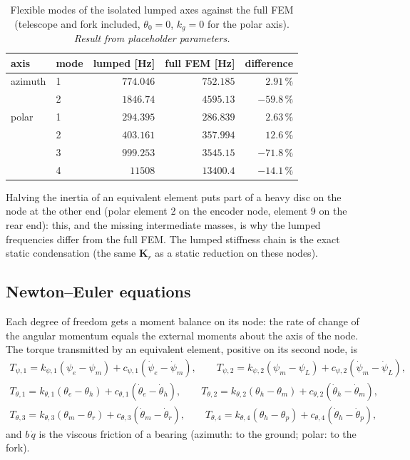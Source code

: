\documentclass[10pt,a4paper]{article}
\numberwithin{equation}{section}
\begin{document}
\begin{table}[H]\centering\small
\caption{Flexible modes of the isolated lumped axes against the full FEM (telescope and fork included, $\theta_0 = 0$, $k_g = 0$ for the polar axis). \emph{Result from placeholder parameters.}}\label{tab:lump_freq}
\begin{tabular}{llrrr}\toprule
axis & mode & lumped [Hz] & full FEM [Hz] & difference \\ \midrule
azimuth & 1 & $774.046$ & $752.185$ & $2.91\,\%$ \\
 & 2 & $1846.74$ & $4595.13$ & $-59.8\,\%$ \\
polar & 1 & $294.395$ & $286.839$ & $2.63\,\%$ \\
 & 2 & $403.161$ & $357.994$ & $12.6\,\%$ \\
 & 3 & $999.253$ & $3545.15$ & $-71.8\,\%$ \\
 & 4 & $11508$ & $13400.4$ & $-14.1\,\%$ \\
\bottomrule\end{tabular}\end{table}
Halving the inertia of an equivalent element puts part of a heavy disc on the node at the other end (polar element 2 on the encoder node, element 9 on the rear end): this, and the missing intermediate masses, is why the lumped frequencies differ from the full FEM. The lumped stiffness chain is the exact static condensation (the same $\mathbf K_r$ as a static reduction on these nodes).
\subsection{Newton--Euler equations}\label{subsec:lump_ne}
Each degree of freedom gets a moment balance on its node: the rate of change of the angular momentum equals the external moments about the axis of the node. The torque transmitted by an equivalent element, positive on its second node, is
\begin{gather}
T_{\psi,1} = k_{\psi,1}(\psi_e - \psi_m) + c_{\psi,1}(\dot\psi_e - \dot\psi_m),\qquad T_{\psi,2} = k_{\psi,2}(\psi_m - \psi_L) + c_{\psi,2}(\dot\psi_m - \dot\psi_L),\\
T_{\theta,1} = k_{\theta,1}(\theta_e - \theta_h) + c_{\theta,1}(\dot\theta_e - \dot\theta_h),\qquad T_{\theta,2} = k_{\theta,2}(\theta_h - \theta_m) + c_{\theta,2}(\dot\theta_h - \dot\theta_m),\\ T_{\theta,3} = k_{\theta,3}(\theta_m - \theta_r) + c_{\theta,3}(\dot\theta_m - \dot\theta_r),\qquad T_{\theta,4} = k_{\theta,4}(\theta_h - \theta_p) + c_{\theta,4}(\dot\theta_h - \dot\theta_p),
\end{gather}
and $b\,\dot q$ is the viscous friction of a bearing (azimuth: to the ground; polar: to the fork).
\end{document}
